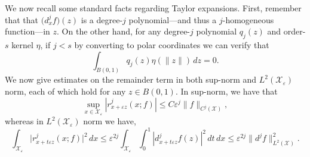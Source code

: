 \documentclass{article}
\newcommand{\1}{\mathbf{1}}
\newcommand{\Leb}{L}
\newcommand{\mc}[1]{\mathcal{#1}}
\theoremstyle{definition}
\theoremstyle{remark}
\begin{document}
We now recall some standard facts regarding Taylor expansions. First, remember that that $\bigl(d_x^{j}f\bigr)(z)$ is a degree-$j$ polynomial---and thus a $j$-homogeneous function---in $z$. On the other hand, for any degree-$j$ polynomial $q_j(z)$ and order-$s$ kernel $\eta$, if $j < s$ by converting to polar coordinates we can verify that
\begin{equation*}
\int_{B(0,1)} q_j(z) \eta(\|z\|) \,dz = 0.
\end{equation*}
We now give estimates on the remainder term in both sup-norm and $L^2(\mc{X}_{\varepsilon})$ norm, each of which hold for any $z \in B(0,1)$. In sup-norm, we have that 
\begin{equation*}
\sup_{x \in \mc{X}_{\varepsilon}}|r_{x + \varepsilon z}^j(x;f)| \leq C \varepsilon^j \|f\|_{C^j(\mc{X})},
\end{equation*}
whereas in $L^2(\mc{X}_{\varepsilon})$ norm we have,
\begin{equation}
\label{eqn:sobolev_remainder_term}
\int_{\mc{X}_{\varepsilon}} \bigl|r_{x + t \varepsilon z}^j(x;f)\bigr|^2 \,dx \leq \varepsilon^{2j} \int_{\mc{X}_{\varepsilon}} \int_{0}^{1} |d_{x + t\varepsilon z}^jf(z)|^2 \,dt \,dx \leq \varepsilon^{2j} \|d^jf\|_{\Leb^2(\mc{X})}^2.
\end{equation}
\end{document}
